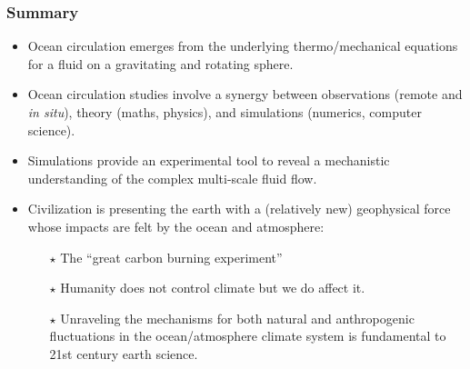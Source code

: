 \documentclass[10pt]{beamer}
\begin{document}
\begin{frame}
  \frametitle{Summary}

\begin{exampleblock}{}

\begin{itemize}

\item Ocean circulation emerges from the underlying thermo/mechanical
  equations for a fluid on a gravitating and rotating sphere.

\item Ocean circulation studies involve a synergy between observations
  (remote and {\it in situ}), theory (maths, physics), and
  simulations (numerics, computer science).

\item Simulations provide an experimental tool to reveal a mechanistic
  understanding of the complex multi-scale fluid flow.

\item Civilization is presenting the earth with a (relatively new)
  geophysical force whose impacts are felt by the ocean and
  atmosphere: 
   \begin{itemize}
   \item[$\star$]  The ``great carbon burning experiment'' 
   \item[$\star$] Humanity does not control climate but we do affect
     it.
   \item[$\star$] Unraveling the mechanisms for both natural and
     anthropogenic fluctuations in the ocean/atmosphere climate system
     is fundamental to 21st century earth science.
  \end{itemize}
 
\end{itemize}


\end{exampleblock}{}

\end{frame}
\end{document}
